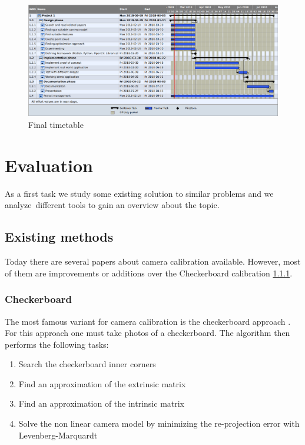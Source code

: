 \documentclass[11pt,a4paper,titlepage,oneside]{report}
\begin{document}
\begin{figure}[H]
	\includegraphics[width=1.0\textwidth]{img/timetable_is.png}
	\caption{Final timetable}\label{fig:timetable_is}
\end{figure}



\chapter{Evaluation}

As a first task we study some existing solution to similar problems and we analyze different tools to gain an overview about the topic.

\section{Existing methods}

Today there are several papers about camera calibration available. However, most of them are improvements or additions over the Checkerboard calibration \ref{sec:checkerboard}.

\subsection{Checkerboard}\label{sec:checkerboard}
The most famous variant for camera calibration is the checkerboard approach \cite{Zhang}. For this approach one must take photos of a checkerboard. The algorithm then performs the following tasks:
\begin{enumerate}
  \item Search the checkerboard inner corners
  \item Find an approximation of the extrinsic matrix
  \item Find an approximation of the intrinsic matrix
  \item Solve the non linear camera model by minimizing the re-projection error with Levenberg-Marquardt
\end{enumerate}
\end{document}
